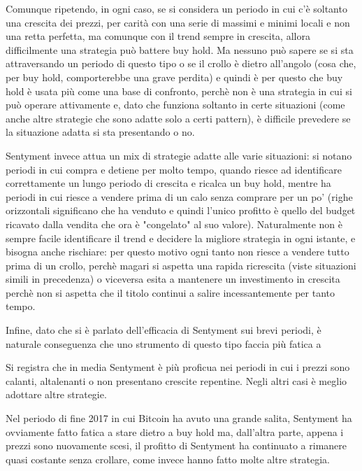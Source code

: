 \documentclass[a4paper,12pt]{report}
\begin{document}
\begin{fig}
Comunque ripetendo, in ogni caso, se si considera un periodo in cui c'è soltanto una crescita dei prezzi, per carità con una serie di massimi e minimi locali e non una retta perfetta, ma comunque con il trend sempre in crescita, allora difficilmente una strategia può battere buy hold. Ma nessuno può sapere se si sta attraversando un periodo di questo tipo o se il crollo è dietro all'angolo (cosa che, per buy hold, comporterebbe una grave perdita) e quindi è per questo che buy hold è usata più come una base di confronto, perchè non è una strategia in cui si può operare attivamente e, dato che funziona soltanto in certe situazioni (come anche altre strategie che sono adatte solo a certi pattern), è difficile prevedere se la situazione adatta si sta presentando o no.

Sentyment invece attua un mix di strategie adatte alle varie situazioni: si notano periodi in cui compra e detiene per molto tempo, quando riesce ad identificare correttamente un lungo periodo di crescita e ricalca un buy hold, mentre ha periodi in cui riesce a vendere prima di un calo senza comprare per un po' (righe orizzontali significano che ha venduto e quindi l'unico profitto è quello del budget ricavato dalla vendita che ora è "congelato" al suo valore). Naturalmente non è sempre facile identificare il trend e decidere la migliore strategia in ogni istante, e bisogna anche rischiare: per questo motivo ogni tanto non riesce a vendere tutto prima di un crollo, perchè magari si aspetta una rapida ricrescita (viste situazioni simili in precedenza) o viceversa esita a mantenere un investimento in crescita perchè non si aspetta che il titolo continui a salire incessantemente per tanto tempo.

Infine, dato che si è parlato dell'efficacia di Sentyment sui brevi periodi, è naturale conseguenza che uno strumento di questo tipo faccia più fatica a 

Si registra che in media Sentyment è più proficua nei periodi in cui i prezzi sono calanti, altalenanti o non presentano crescite repentine. Negli altri casi è meglio adottare altre strategie.


Nel periodo di fine 2017 in cui Bitcoin ha avuto una grande salita, Sentyment ha ovviamente fatto fatica a stare dietro a buy hold ma, dall'altra parte, appena i prezzi sono nuovamente scesi, il profitto di Sentyment ha continuato a rimanere quasi costante senza crollare, come invece hanno fatto molte altre strategia.



\end{fig}
\end{document}
